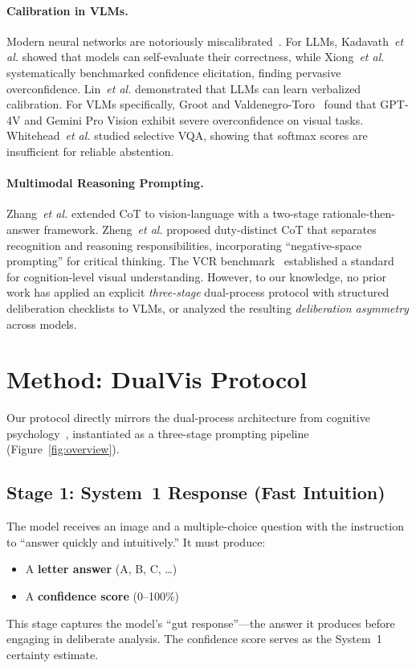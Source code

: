 \documentclass{cvpr}
\newcommand{\method}{DualVis}
\providecommand{\etal}{\textit{et al.}\xspace}
\begin{document}
\paragraph{Calibration in VLMs.}
Modern neural networks are notoriously miscalibrated~\cite{guo2017calibration,naeini2015obtaining}. For LLMs, Kadavath~\etal\cite{kadavath2022language} showed that models can self-evaluate their correctness, while Xiong~\etal\cite{xiong2024can} systematically benchmarked confidence elicitation, finding pervasive overconfidence. Lin~\etal\cite{lin2022teaching} demonstrated that LLMs can learn verbalized calibration. For VLMs specifically, Groot and Valdenegro-Toro~\cite{groot2024overconfidence} found that GPT-4V and Gemini Pro Vision exhibit severe overconfidence on visual tasks. Whitehead~\etal\cite{whitehead2022reliable} studied selective VQA, showing that softmax scores are insufficient for reliable abstention.

\paragraph{Multimodal Reasoning Prompting.}
Zhang~\etal\cite{zhang2023multimodal} extended CoT to vision-language with a two-stage rationale-then-answer framework. Zheng~\etal\cite{zheng2023ddcot} proposed duty-distinct CoT that separates recognition and reasoning responsibilities, incorporating ``negative-space prompting'' for critical thinking. The VCR benchmark~\cite{zellers2019vcr} established a standard for cognition-level visual understanding. However, to our knowledge, no prior work has applied an explicit \emph{three-stage} dual-process protocol with structured deliberation checklists to VLMs, or analyzed the resulting \emph{deliberation asymmetry} across models.

\section{Method: \method{} Protocol}
\label{sec:method}

Our protocol directly mirrors the dual-process architecture from cognitive psychology~\cite{kahneman2011thinking,evans2013dual}, instantiated as a three-stage prompting pipeline (Figure~\ref{fig:overview}).

\subsection{Stage 1: System~1 Response (Fast Intuition)}
The model receives an image and a multiple-choice question with the instruction to ``answer quickly and intuitively.'' It must produce:
\begin{itemize}
    \item A \textbf{letter answer} (A, B, C, \ldots)
    \item A \textbf{confidence score} (0--100\%)
\end{itemize}
This stage captures the model's ``gut response''---the answer it produces before engaging in deliberate analysis. The confidence score serves as the System~1 certainty estimate.
\end{document}
